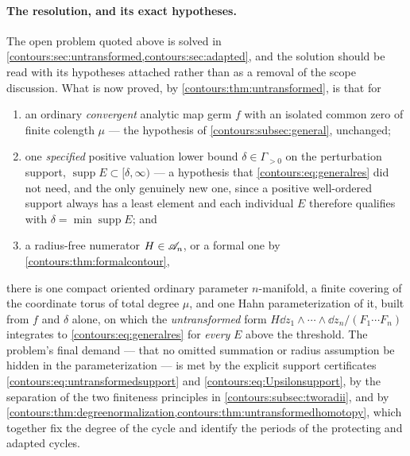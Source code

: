 \documentclass[11pt,letterpaper]{article}
\theoremstyle{definition}
\theoremstyle{remark}
\newcommand{\supp}{\operatorname{supp}}\newcommand{\Res}{\operatorname{Res}}
\numberwithin{equation}{section}
\begin{document}
\paragraph{The resolution, and its exact hypotheses.}
\label{contours:para:resolution}
The open problem quoted above is solved in
\cref{contours:sec:untransformed,contours:sec:adapted}, and the solution should
be read with its hypotheses attached rather than as a removal of the scope
discussion. What is now proved, by \cref{contours:thm:untransformed}, is that for
\begin{enumerate}
\item an ordinary \emph{convergent} analytic map germ $f$ with an isolated common
zero of finite colength $\mu$ --- the hypothesis of
\cref{contours:subsec:general}, unchanged;
\item one \emph{specified} positive valuation lower bound $\delta\in\Gamma_{>0}$
on the perturbation support, $\supp E\subset[\delta,\infty)$ --- a hypothesis
that \eqref{contours:eq:generalres} did not need, and the only genuinely new
one, since a positive well-ordered support always has a least element and each
individual $E$ therefore qualifies with $\delta=\min\supp E$; and
\item a radius-free numerator $H\in\mathscr A_n$, or a formal one by
\cref{contours:thm:formalcontour},
\end{enumerate}
there is one compact oriented ordinary parameter $n$-manifold, a finite covering
of the coordinate torus of total degree $\mu$, and one Hahn parameterization of
it, built from $f$ and $\delta$ alone, on which the \emph{untransformed} form
$H\dd z_1\wedge\cdots\wedge \dd z_n/(F_1\cdots F_n)$ integrates to
\eqref{contours:eq:generalres} for \emph{every} $E$ above the threshold. The
problem's final demand --- that no omitted summation or radius assumption be
hidden in the parameterization --- is met by the explicit support certificates
\eqref{contours:eq:untransformedsupport} and
\eqref{contours:eq:Upsilonsupport}, by the separation of the two finiteness
principles in \cref{contours:subsec:tworadii}, and by
\cref{contours:thm:degreenormalization,contours:thm:untransformedhomotopy},
which together fix the degree of the cycle and identify the periods of the
protecting and adapted cycles.
\end{document}
